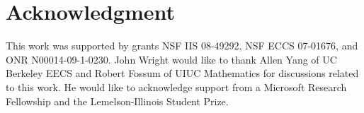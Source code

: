 \documentclass[12pt,journal,draftcls,letterpaper,onecolumn]{IEEEtran}
\begin{document}

%
%


\section*{Acknowledgment}
This work was supported by grants NSF IIS 08-49292, NSF ECCS
07-01676, and ONR N00014-09-1-0230. John Wright would like to
thank Allen Yang of UC Berkeley EECS and Robert Fossum of UIUC
Mathematics for discussions related to this work. He would like
to acknowledge support from a Microsoft Research Fellowship and
the Lemelson-Illinois Student Prize.
\end{document}
